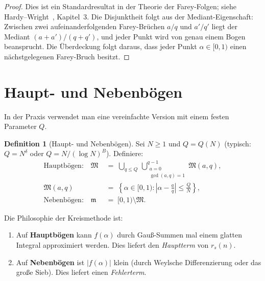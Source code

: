 \documentclass[12pt,a4paper]{amsart}
\theoremstyle{definition}
\newtheorem{definition}[theorem]{Definition}
\begin{document}
\begin{proof}
  Dies ist ein Standardresultat in der Theorie der Farey-Folgen;
  siehe Hardy--Wright~\cite{HardyWright}, Kapitel~3.  Die Disjunktheit
  folgt aus der Mediant-Eigenschaft: Zwischen zwei aufeinanderfolgenden
  Farey-Brüchen $a/q$ und $a'/q'$ liegt der Mediant $(a+a')/(q+q')$,
  und jeder Punkt wird von genau einem Bogen beansprucht.  Die
  Überdeckung folgt daraus, dass jeder Punkt $\alpha \in [0,1)$ einen
  nächstgelegenen Farey-Bruch besitzt.
\end{proof}

\section{Haupt- und Nebenbögen}
\label{sec:boegen}

In der Praxis verwendet man eine vereinfachte Version mit einem festen
Parameter $Q$.

\begin{definition}[Haupt- und Nebenbögen]\label{def:boegen}
  Sei $N \geq 1$ und $Q = Q(N)$ (typisch: $Q = N^\delta$ oder
  $Q = N/(\log N)^B$).  Definiere:
  \begin{align*}
    \text{Hauptbögen:}\quad
    \mathfrak{M} &\;=\; \bigcup_{q \leq Q}\, \bigcup_{\substack{a=0\\ \gcd(a,q)=1}}^{q-1}
                         \mathfrak{M}(a, q), \\
    \mathfrak{M}(a, q) &\;=\; \left\{\alpha \in [0,1) :
      \left|\alpha - \frac{a}{q}\right| \leq \frac{Q}{N}\right\}, \\
    \text{Nebenbögen:}\quad
    \mathfrak{m} &\;=\; [0,1) \setminus \mathfrak{M}.
  \end{align*}
\end{definition}

Die Philosophie der Kreismethode ist:
\begin{enumerate}
  \item Auf \textbf{Hauptbögen} kann $f(\alpha)$ durch Gauß-Summen
    mal einem glatten Integral approximiert werden.
    Dies liefert den \emph{Hauptterm} von $r_s(n)$.
  \item Auf \textbf{Nebenbögen} ist $|f(\alpha)|$ klein (durch
    Weylsche Differenzierung oder das große Sieb).
    Dies liefert einen \emph{Fehlerterm}.
\end{enumerate}
\end{document}
